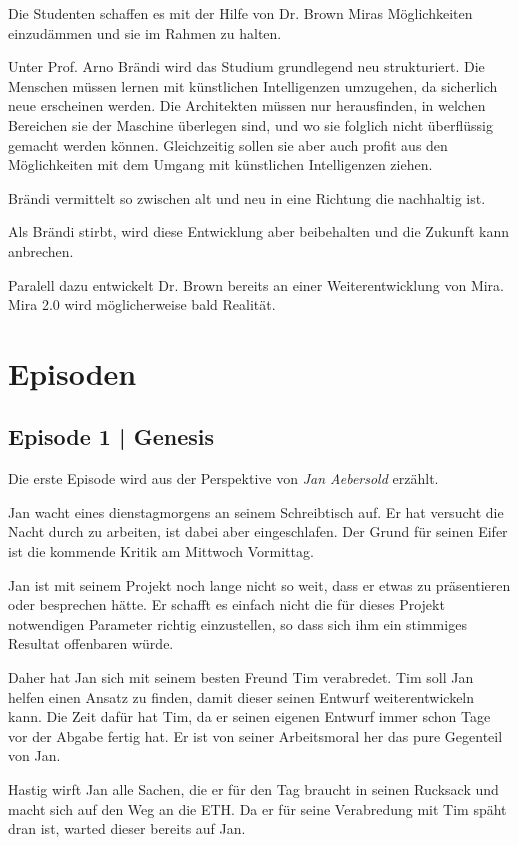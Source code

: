 \documentclass[11pt,a4paper,ngerman]{scrreprt}
\begin{document}
Die Studenten schaffen es mit der Hilfe von Dr. Brown Miras Möglichkeiten
einzudämmen und sie im Rahmen zu halten.

Unter Prof. Arno Brändi wird das Studium grundlegend neu strukturiert. Die
Menschen müssen lernen mit künstlichen Intelligenzen umzugehen, da sicherlich
neue erscheinen werden. Die Architekten müssen nur herausfinden, in welchen
Bereichen sie der Maschine überlegen sind, und wo sie folglich nicht
überflüssig gemacht werden können. Gleichzeitig sollen sie aber auch profit
aus den Möglichkeiten mit dem Umgang mit künstlichen Intelligenzen ziehen.

Brändi vermittelt so zwischen alt und neu in eine Richtung die nachhaltig
ist.

Als Brändi stirbt, wird diese Entwicklung aber beibehalten und die Zukunft
kann anbrechen.

Paralell dazu entwickelt Dr. Brown bereits an einer Weiterentwicklung von
Mira. Mira 2.0 wird möglicherweise bald Realität.

\chapter*{Episoden}

\section*{Episode 1 | Genesis}

Die erste Episode wird aus der Perspektive von \emph{Jan Aebersold} erzählt.

Jan wacht eines dienstagmorgens an seinem Schreibtisch auf. Er hat versucht
die Nacht durch zu arbeiten, ist dabei aber eingeschlafen. Der Grund für
seinen Eifer ist die kommende Kritik am Mittwoch Vormittag.

Jan ist mit seinem Projekt noch lange nicht so weit, dass er etwas zu
präsentieren oder besprechen hätte. Er schafft es einfach nicht die für
dieses Projekt notwendigen Parameter richtig einzustellen, so dass sich ihm
ein stimmiges Resultat offenbaren würde.

Daher hat Jan sich mit seinem besten Freund Tim verabredet. Tim soll Jan
helfen einen Ansatz zu finden, damit dieser seinen Entwurf weiterentwickeln
kann. Die Zeit dafür hat Tim, da er seinen eigenen Entwurf immer schon Tage
vor der Abgabe fertig hat. Er ist von seiner Arbeitsmoral her das pure
Gegenteil von Jan.

Hastig wirft Jan alle Sachen, die er für den Tag braucht in seinen Rucksack
und macht sich auf den Weg an die ETH. Da er für seine Verabredung mit Tim
späht dran ist, warted dieser bereits auf Jan.
\end{document}
